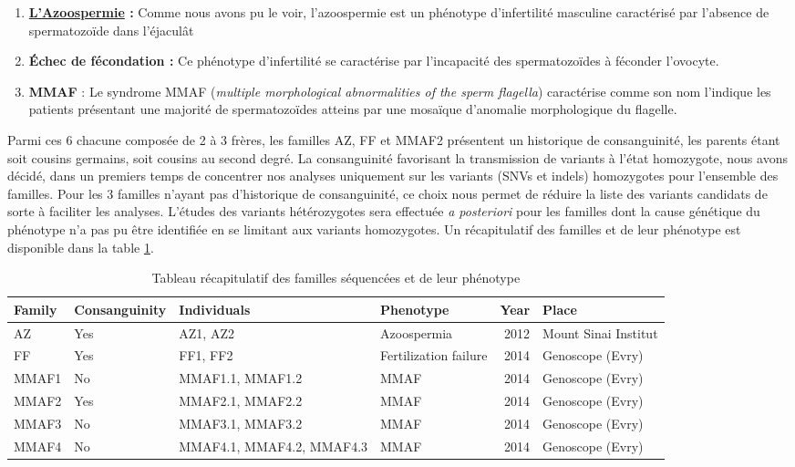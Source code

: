\documentclass[12pt,twoside]{reedthesis}
\providecommand{\tightlist}{%
  \setlength{\itemsep}{0pt}\setlength{\parskip}{0pt}}
\theoremstyle{definition}
\theoremstyle{definition}
\theoremstyle{remark}
\begin{document}
  \begin{enumerate}
  \def\labelenumi{\arabic{enumi}.}
  \tightlist
  \item
    \textbf{\protect\hyperlink{infquant}{L'Azoospermie} :} Comme nous
    avons pu le voir, l'azoospermie est un phénotype d'infertilité
    masculine caractérisé par l'absence de spermatozoïde dans l'éjaculât\\
  \item
    \textbf{Échec de fécondation :} Ce phénotype d'infertilité se
    caractérise par l'incapacité des spermatozoïdes à féconder
    l'ovocyte.\\
  \item
    \textbf{MMAF} : Le syndrome MMAF (\emph{multiple morphological
    abnormalities of the sperm flagella}) caractérise comme son nom
    l'indique les patients présentant une majorité de spermatozoïdes
    atteins par une mosaïque d'anomalie morphologique du flagelle.
  \end{enumerate}
  
  Parmi ces 6 chacune composée de 2 à 3 frères, les familles AZ, FF et
  MMAF2 présentent un historique de consanguinité, les parents étant soit
  cousins germains, soit cousins au second degré. La consanguinité
  favorisant la transmission de variants à l'état homozygote, nous avons
  décidé, dans un premiers temps de concentrer nos analyses uniquement sur
  les variants (SNVs et indels) homozygotes pour l'ensemble des familles.
  Pour les 3 familles n'ayant pas d'historique de consanguinité, ce choix
  nous permet de réduire la liste des variants candidats de sorte à
  faciliter les analyses. L'études des variants hétérozygotes sera
  effectuée \emph{a posteriori} pour les familles dont la cause génétique
  du phénotype n'a pas pu être identifiée en se limitant aux variants
  homozygotes. Un récapitulatif des familles et de leur phénotype est
  disponible dans la table \ref{tab:tabrecapfam}.
  
  \newpage
  
  \begin{landscape}
  \begin{longtable}[t]{llllrl}
  \caption{\label{tab:tabrecapfam}Tableau récapitulatif des familles séquencées et de leur phénotype}\\
  \toprule
  Family & Consanguinity & Individuals & Phenotype & Year & Place\\
  \midrule
  AZ & Yes & AZ1, AZ2 & Azoospermia & 2012 & Mount Sinai Institut\\
  FF & Yes & FF1, FF2 & Fertilization failure & 2014 & Genoscope (Evry)\\
  MMAF1 & No & MMAF1.1, MMAF1.2 & MMAF & 2014 & Genoscope (Evry)\\
  MMAF2 & Yes & MMAF2.1, MMAF2.2 & MMAF & 2014 & Genoscope (Evry)\\
  MMAF3 & No & MMAF3.1, MMAF3.2 & MMAF & 2014 & Genoscope (Evry)\\
  MMAF4 & No & MMAF4.1, MMAF4.2, MMAF4.3 & MMAF & 2014 & Genoscope (Evry)\\
  \bottomrule
  \end{longtable}
  \end{landscape}
  
\end{document}
